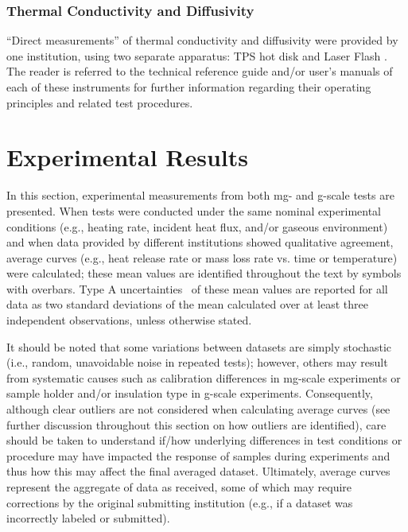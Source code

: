 \documentclass{book}
\begin{document}
\subsection{Thermal Conductivity and Diffusivity}

``Direct measurements'' of thermal conductivity and diffusivity were provided by one institution, using two separate apparatus: TPS hot disk \cite{gustafsson1991transient} and Laser Flash \cite{NeztschLFA}. The reader is referred to the technical reference guide and/or user’s manuals of each of these instruments for further information regarding their operating principles and related test procedures.



\chapter{Experimental Results}
\label{exp_results}

In this section, experimental measurements from both mg- and g-scale tests are presented. When tests were conducted under the same nominal experimental conditions (e.g., heating rate, incident heat flux, and/or gaseous environment) and when data provided by different institutions showed qualitative agreement, average curves (e.g., heat release rate or mass loss rate vs. time or temperature) were calculated; these mean values are identified throughout the text by symbols with overbars. Type A uncertainties~\cite{taylor1994nist} of these mean values are reported for all data as two standard deviations of the mean calculated over at least three independent observations, unless otherwise stated.

It should be noted that some variations between datasets are simply stochastic (i.e., random, unavoidable noise in repeated tests); however, others may result from systematic causes such as calibration differences in mg-scale experiments or sample holder and/or insulation type in g-scale experiments. Consequently, although clear outliers are not considered when calculating average curves (see further discussion throughout this section on how outliers are identified), care should be taken to understand if/how underlying differences in test conditions or procedure may have impacted the response of samples during experiments and thus how this may affect the final averaged dataset. Ultimately, average curves represent the aggregate of data as received, some of which may require corrections by the original submitting institution (e.g., if a dataset was incorrectly labeled or submitted).
\end{document}
